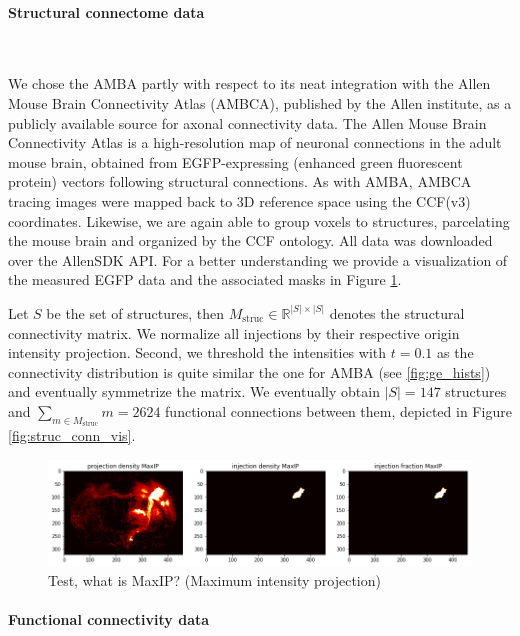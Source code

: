 \documentclass[]{article}
\renewcommand{\cite}{\citep}
\begin{document}
\paragraph{Structural connectome data}\mbox{}\\
\label{sec:struc_conn}

We chose the AMBA partly with respect to its neat integration with the Allen Mouse Brain Connectivity Atlas (AMBCA)\cite{oh2014mesoscale}, published by the Allen institute, as a publicly available source for axonal connectivity data. The Allen Mouse Brain Connectivity Atlas is a high-resolution map of neuronal connections in the adult mouse brain, obtained from EGFP-expressing (enhanced green fluorescent protein) vectors following structural connections. As with AMBA, AMBCA tracing images were mapped back to 3D reference space using the CCF(v3) coordinates. Likewise, we are again able to group voxels to structures, parcelating the mouse brain and organized by the CCF ontology. All data was downloaded over the AllenSDK API. For a better understanding we provide a visualization of the measured EGFP data and the associated masks in Figure \ref{fig:struc_conn}.

Let $S$ be the set of structures, then $M_{\text{struc}}\in\mathbb{R}^{|S|\times|S|}$ denotes the structural connectivity matrix. We normalize all injections by their respective origin intensity projection. Second, we threshold the intensities with $t=0.1$ as the connectivity distribution is quite similar the one for AMBA (see \ref{fig:ge_hists}) and eventually symmetrize the matrix. We eventually obtain $|S|=147$ structures and $\sum_{m\in M_{\text{struc}} }m=2624$ functional connections between them, depicted in Figure \ref{fig:struc_conn_vis}.


\begin{figure}
	\centering
	\includegraphics[width=1.\linewidth]{figures/projection_data_visualization.png}
	\caption{Test, what is MaxIP? (Maximum intensity projection)}
	\label{fig:struc_conn}
\end{figure} 

\paragraph{Functional connectivity data} \mbox{}\\
\label{sec:fun_conn}
\end{document}
